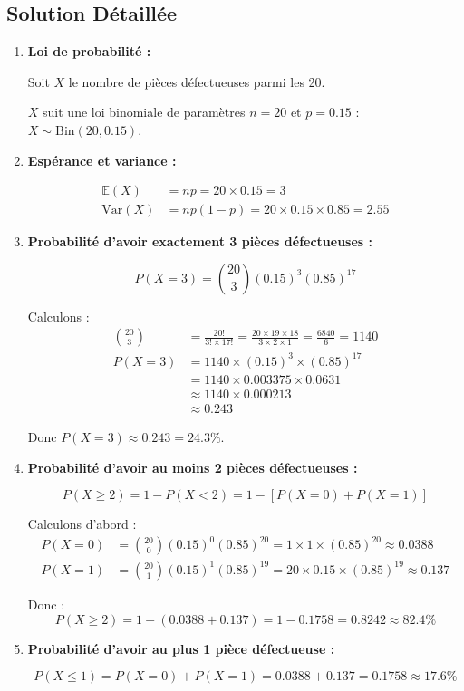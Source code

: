 \documentclass[11pt,a4paper]{article}
\newcommand{\Var}{\text{Var}}
\newcommand{\E}{\mathbb{E}}
\newcommand{\Bin}{\text{Bin}}
\begin{document}
\subsection{Solution Détaillée}

\begin{enumerate}
    \item \textbf{Loi de probabilité :}
    
    Soit $X$ le nombre de pièces défectueuses parmi les 20.
    
    $X$ suit une loi binomiale de paramètres $n = 20$ et $p = 0.15$ : $X \sim \Bin(20, 0.15)$.
    
    \item \textbf{Espérance et variance :}
    
    \begin{align}
    \E(X) &= np = 20 \times 0.15 = 3 \\
    \Var(X) &= np(1-p) = 20 \times 0.15 \times 0.85 = 2.55
    \end{align}
    
    \item \textbf{Probabilité d'avoir exactement 3 pièces défectueuses :}
    
    $$P(X = 3) = \binom{20}{3} (0.15)^3 (0.85)^{17}$$
    
    Calculons :
    \begin{align}
    \binom{20}{3} &= \frac{20!}{3! \times 17!} = \frac{20 \times 19 \times 18}{3 \times 2 \times 1} = \frac{6840}{6} = 1140 \\
    P(X = 3) &= 1140 \times (0.15)^3 \times (0.85)^{17} \\
    &= 1140 \times 0.003375 \times 0.0631 \\
    &\approx 1140 \times 0.000213 \\
    &\approx 0.243
    \end{align}
    
    Donc $P(X = 3) \approx 0.243 = 24.3\%$.
    
    \item \textbf{Probabilité d'avoir au moins 2 pièces défectueuses :}
    
    $$P(X \geq 2) = 1 - P(X < 2) = 1 - [P(X = 0) + P(X = 1)]$$
    
    Calculons d'abord :
    \begin{align}
    P(X = 0) &= \binom{20}{0} (0.15)^0 (0.85)^{20} = 1 \times 1 \times (0.85)^{20} \approx 0.0388 \\
    P(X = 1) &= \binom{20}{1} (0.15)^1 (0.85)^{19} = 20 \times 0.15 \times (0.85)^{19} \approx 0.137
    \end{align}
    
    Donc :
    $$P(X \geq 2) = 1 - (0.0388 + 0.137) = 1 - 0.1758 = 0.8242 \approx 82.4\%$$
    
    \item \textbf{Probabilité d'avoir au plus 1 pièce défectueuse :}
    
    $$P(X \leq 1) = P(X = 0) + P(X = 1) = 0.0388 + 0.137 = 0.1758 \approx 17.6\%$$
\end{enumerate}
\end{document}
